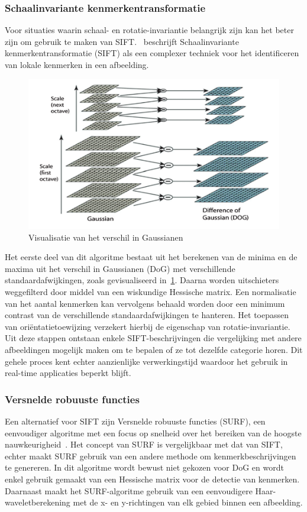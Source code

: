 \subsubsection{Schaalinvariante kenmerkentransformatie}
Voor situaties waarin schaal- en rotatie-invariantie belangrijk zijn kan het beter zijn om gebruik te maken van SIFT\@.
\textcite{Tamara2022}~beschrijft Schaalinvariante kenmerkentransformatie (SIFT) als een complexer techniek voor het identificeren van lokale kenmerken in een afbeelding.
\begin{figure}
    \includegraphics[width=1\linewidth]{images/DoG}
    \caption{Visualisatie van het verschil in Gaussianen~\autocite{Lowe2004}}
    \label{fig:difference-of-gaussian}
\end{figure}
Het eerste deel van dit algoritme bestaat uit het berekenen van de minima en de maxima uit het verschil in Gaussianen (DoG) met verschillende standaardafwijkingen, zoals gevisualiseerd in~\ref{fig:difference-of-gaussian}.
Daarna worden uitschieters weggefilterd door middel van een wiskundige Hessische matrix.
Een normalisatie van het aantal kenmerken kan vervolgens behaald worden door een minimum contrast van de verschillende standaardafwijkingen te hanteren.
Het toepassen van ori\"entatietoewijzing verzekert hierbij de eigenschap van rotatie-invariantie.
Uit deze stappen ontstaan enkele SIFT-beschrijvingen die vergelijking met andere afbeeldingen mogelijk maken om te bepalen of ze tot dezelfde categorie horen.
Dit gehele proces kent echter aanzienlijke verwerkingstijd waardoor het gebruik in real-time applicaties beperkt blijft.

\subsubsection{Versnelde robuuste functies}
Een alternatief voor SIFT zijn Versnelde robuuste functies (SURF), een eenvoudiger algoritme met een focus op snelheid over het bereiken van de hoogste nauwkeurigheid~\autocite{Wu2013}.
Het concept van SURF is vergelijkbaar met dat van SIFT, echter maakt SURF gebruik van een andere methode om kenmerkbeschrijvingen te genereren.
In dit algoritme wordt bewust niet gekozen voor DoG en wordt enkel gebruik gemaakt van een Hessische matrix voor de detectie van kenmerken.
Daarnaast maakt het SURF-algoritme gebruik van een eenvoudigere Haar-waveletberekening met de x- en y-richtingen van elk gebied binnen een afbeelding.

